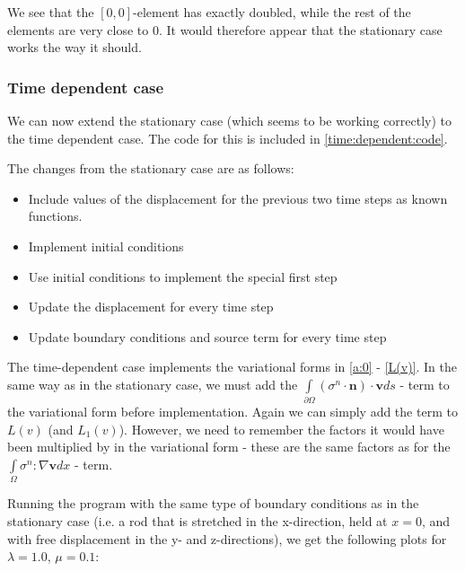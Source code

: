 \documentclass[twoside]{article}
\begin{document}
We see that the $[0,0]$-element has exactly doubled, while the rest of the elements are very close to $0$. It would therefore appear that the stationary case works the way it should.





\subsubsection{Time dependent case}

We can now extend the stationary case (which seems to be working correctly) to the time dependent case. The code for this is included in \ref{time:dependent:code}. 

The changes from the stationary case are as follows:
\begin{itemize}
\item Include values of the displacement for the previous two time steps as known functions.
\item Implement initial conditions
\item Use initial conditions to implement the special first step
\item Update the displacement for every time step
\item Update boundary conditions and source term for every time step
\end{itemize}


The time-dependent case implements the variational forms in \eqref{a:0} - \eqref{L(v)}. In the same way as in the stationary case, we must add the $\int\limits_{\partial\Omega} (\sigma^n\cdot \mathbf{n})\cdot \mathbf{v} ds$ - term to the variational form before implementation. Again we can simply add the term to $L(v)$ (and $L_1(v)$). However, we need to remember the factors it would have been multiplied by in the variational form - these are the same factors as for the $\int\limits_{\Omega} \sigma^n: \nabla\mathbf{v}dx$ - term.

Running the program with the same type of boundary conditions as in the stationary case (i.e. a rod that is stretched in the x-direction, held at $x=0$, and with free displacement in the y- and z-directions), we get the following plots for $\lambda=1.0$, $\mu=0.1$:
\end{document}
